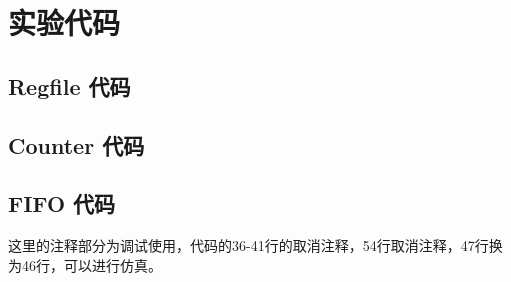 \documentclass[12pt, a4paper]{article}
\begin{document}
\section{实验代码}
\subsection{Regfile 代码}


\subsection{Counter 代码}


\subsection{FIFO 代码}
这里的注释部分为调试使用，代码的36-41行的取消注释，54行取消注释，47行换为46行，可以进行仿真。





\end{document}
